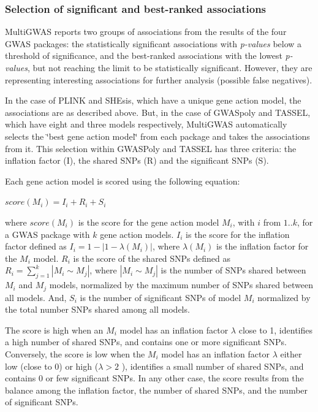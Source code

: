 \documentclass{article}
\begin{document}
\subsubsection{Selection of significant and best-ranked associations}

MultiGWAS reports two groups of associations from the results of the four GWAS packages: the statistically significant associations with \emph{p-values} below a threshold of significance, and the best-ranked associations with the lowest \emph{p-values}, but not reaching the limit to be statistically significant. However, they are representing interesting associations for further analysis (possible false negatives).

In the case of PLINK and SHEsis, which have a unique gene action model, the associations are as described above. But, in the case of GWASpoly and TASSEL, which have eight and three models respectively, MultiGWAS automatically selects the \char`\"{}best gene action model\char`\"{} from each package and takes the associations from it. This selection within GWASPoly and TASSEL has three criteria: the inflation factor (I), the shared SNPs (R) and the significant SNPs (S).

Each gene action model is scored using the following equation: 
\begin{center}
$score(M_{i})=I{}_{i}+R_{i}+S{}_{i}$
\par\end{center}

where $score(M_{i})$ is the score for the gene action model $M_{i}$, with $i$ from $1..k$, for a GWAS package with $k$ gene action models. $I_{i}$ is the score for the inflation factor defined as $I_{i}=1-|1-\lambda(M_{i})|$, where $\lambda(M_{i})$ is the inflation factor for the $M_{i}$ model. $R_{i}$ is the score of the shared SNPs defined as $R_{i}=\sum\limits _{j=1}^{k}{\textstyle |M_{i}\sim M_{j}|}$, where ${\textstyle |M_{i}\sim M_{j}|}$ is the number of SNPs shared between $M_{i}$ and $M_{j}$ models, normalized by the maximum number of SNPs shared between all models. And, $S_{i}$ is the number of significant SNPs of model $M_{i}$ normalized by the total number SNPs shared among all models.

The score is high when an $M_{i}$ model has an inflation factor $\lambda$ close to 1, identifies a high number of shared SNPs, and contains one or more significant SNPs. Conversely, the score is low when the $M_{i}$ model has an inflation factor $\lambda$ either low (close to 0) or high ($\lambda>2$ ), identifies a small number of shared SNPs, and contains 0 or few significant SNPs. In any other case, the score results from the balance among the inflation factor, the number of shared SNPs, and the number of significant SNPs.
\end{document}
